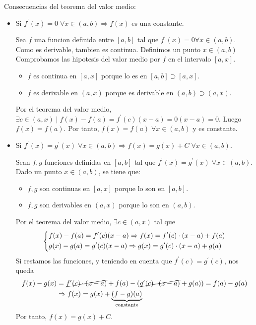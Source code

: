 \begin{remark}
	Consecuencias del teorema del valor medio:
	\begin{itemize}
		\item Si \(f^\prime  (x) = 0 \; \forall x \in (a,b) \Rightarrow f(x )\) es una constante.
		      
		      Sea \(f \) una funcion definida entre \([a,b]\) tal que \(f^\prime (x) = 0 \forall x \in (a,b )\). Como es derivable, tambien es continua. Definimos un punto \(x \in (a,b)\) Comprobamos las hipotesis del valor medio por \(f \) en el intervalo \([a,x ]\).
		      \begin{itemize}
			      \item \(f \) es continua en \([a,x ]\) porque lo es en \([a,b] \supset [a,x ]\).
			      \item \(f \) es derivable en \((a,x )\) porque es derivable en \((a,b) \supset (a,x )\).
		      \end{itemize}
		      Por el teorema del valor medio, \(\exists c \in (a,x) \mid f(x) - f(a) = f^\prime (c) (x-a) = 0 (x-a) = 0\). Luego \(f(x) = f(a )\). Por tanto, \(f(x) = f(a) \;\forall x \in (a,b )\) y es constante.
		\item Si \(f^\prime (x) = g^\prime (x) \; \forall x \in (a,b) \Rightarrow f(x) = g(x) + C \; \forall x \in (a,b )\).
		      
		      Sean \(f,g \) funciones definidas en \([a,b ]\) tal que \(f^\prime (x) = g^\prime (x ) \; \forall x \in (a,b)\). Dado un punto \(x \in (a,b)\), se tiene que: 
		      \begin{itemize}
			      \item \(f, g \) son continuas en \([a,x ]\) porque lo son en \([a,b ]\).
			      \item \(f,g \) son derivables en \((a,x )\) porque lo son en \((a,b )\).
		      \end{itemize}
		      Por el teorema del valor medio, \(\exists c \in (a,x)\) tal que 
		      \[
			      \begin{dcases}
				      f(x) - f(a) = f^\prime (c)(x - a) \Rightarrow f(x) = f^\prime (c) \cdot (x - a) + f(a) \\ 
				      g(x) - g(a) = g^\prime (c) (x-a) \Rightarrow g(x) = g^\prime (c) \cdot (x - a) + g(a)
			      \end{dcases}
		      \]
		      Si restamos las funciones, y teniendo en cuenta que \(f^\prime (c) = g^\prime (c)\), nos queda 
		      \begin{align*}
			      f(x) - g(x) & = \cancel {f^\prime (c) \cdot (x - a)} + f(a) - (\cancel {g^\prime (c) \cdot (x - a)} + g(a)) = f(a) - g(a) \\ & \Rightarrow f(x) = g(x) + \underbrace{(f-g)(a)}_{\text{constante}}
		      \end{align*}
		      Por tanto, \(f(x) = g(x) + C \). 
	\end{itemize}
\end{remark}
